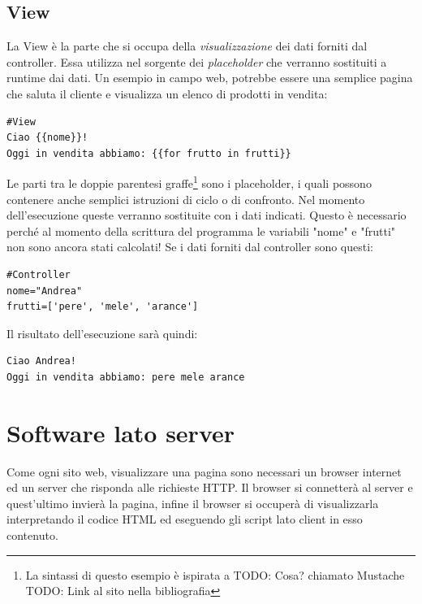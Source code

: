 \subsection{View}\label{sec:view}
La View è la parte che si occupa della \emph{visualizzazione} dei dati forniti dal controller. Essa utilizza nel sorgente dei \emph{placeholder} che verranno sostituiti a runtime dai dati.
Un esempio in campo web, potrebbe essere una semplice pagina che saluta il cliente e visualizza un elenco di prodotti in vendita:
\begin{lstlisting}
#View
Ciao {{nome}}!
Oggi in vendita abbiamo: {{for frutto in frutti}}
\end{lstlisting}
Le parti tra le doppie parentesi graffe\footnote{La sintassi di questo esempio è ispirata a TODO: Cosa? chiamato Mustache TODO: Link al sito nella bibliografia} sono i placeholder, i quali possono contenere anche semplici istruzioni di ciclo o di confronto. Nel momento dell'esecuzione queste verranno sostituite con i dati indicati. Questo è necessario perché al momento della scrittura del programma le variabili "nome" e "frutti" non sono ancora stati calcolati!
Se i dati forniti dal controller sono questi:
\begin{lstlisting}
#Controller
nome="Andrea"
frutti=['pere', 'mele', 'arance']
\end{lstlisting}
Il risultato dell'esecuzione sarà quindi:
\begin{lstlisting}
Ciao Andrea!
Oggi in vendita abbiamo: pere mele arance
\end{lstlisting}

\section{Software lato server}
Come ogni sito web, visualizzare una pagina sono necessari un browser internet ed un server che risponda alle richieste HTTP. Il browser si connetterà al server e quest'ultimo invierà la pagina, infine il browser si occuperà di visualizzarla interpretando il codice HTML ed eseguendo gli script lato client in esso contenuto.
